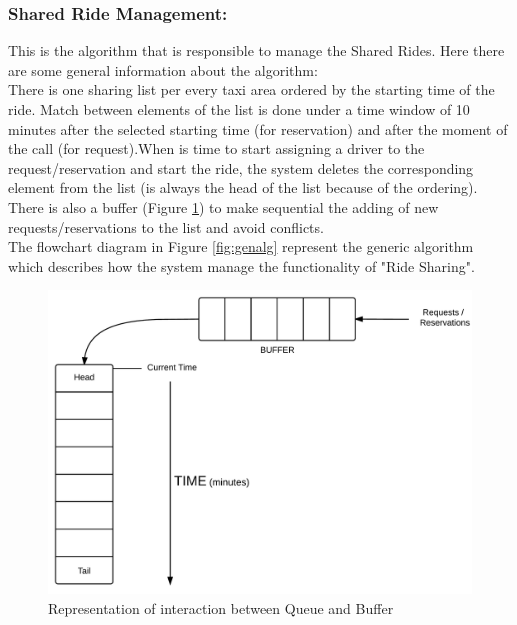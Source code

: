 \subsubsection{Shared Ride Management:}
This is the algorithm that is responsible to manage the Shared Rides. Here there are some general information about the algorithm: \\
There is one sharing list per every taxi area ordered by the starting time of the ride. Match between elements of the list is done under a time window of 10 minutes after the selected starting time (for reservation) and after the moment of the call (for request).When is time to start assigning a driver to the request/reservation and start the ride, the system deletes the corresponding element from the list (is always the head of the list because of the ordering). There is also a buffer (Figure \ref{fig:buff}) to make sequential the adding of new requests/reservations to the list and avoid conflicts.\\
The flowchart diagram in Figure \ref{fig:genalg} represent the generic algorithm which describes how the system manage the functionality of "Ride Sharing".

\begin{figure}[htbp]
\centering
\includegraphics[width=\textwidth]{cpt/img/BufferQueue}
\caption{Representation of interaction between Queue and Buffer}
\label{fig:buff}
\end{figure}
\clearpage

